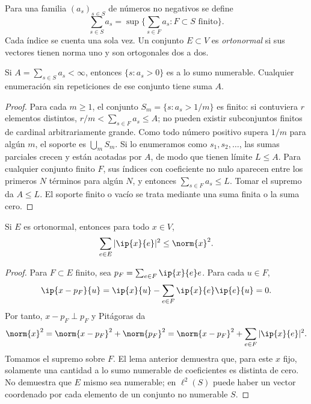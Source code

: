 \begin{definicion}\label{ch29:suma}
Para una familia $(a_s)_{s\in S}$ de números no negativos se define
\[
 \sum_{s\in S}a_s=\sup\Big\{\sum_{s\in F}a_s:F\subset S\text{ finito}\Big\}.
\]
Cada índice se cuenta una sola vez. Un conjunto $E\subset V$ es \emph{ortonormal} si sus vectores tienen norma uno y son ortogonales dos a dos.
\end{definicion}

\begin{lema}\label{ch29:soporte}
Si $A=\sum_{s\in S}a_s<\infty$, entonces $\{s:a_s>0\}$ es a lo sumo numerable. Cualquier enumeración sin repeticiones de ese conjunto tiene suma $A$.
\end{lema}
\begin{proof}
Para cada $m\geq1$, el conjunto $S_m=\{s:a_s>1/m\}$ es finito: si contuviera $r$ elementos distintos, $r/m<\sum_{s\in F}a_s\leq A$; no pueden existir subconjuntos finitos de cardinal arbitrariamente grande. Como todo número positivo supera $1/m$ para algún $m$, el soporte es $\bigcup_m S_m$. Si lo enumeramos como $s_1,s_2,\dots$, las sumas parciales crecen y están acotadas por $A$, de modo que tienen límite $L\leq A$. Para cualquier conjunto finito $F$, sus índices con coeficiente no nulo aparecen entre los primeros $N$ términos para algún $N$, y entonces $\sum_{s\in F}a_s\leq L$. Tomar el supremo da $A\leq L$. El soporte finito o vacío se trata mediante una suma finita o la suma cero.
\end{proof}

\begin{teorema}[Bessel]\label{ch29:bessel}
Si $E$ es ortonormal, entonces para todo $x\in V$,
\[
 \sum_{e\in E}|\ip{x}{e}|^{2}\leq\norm{x}^{2}.
\]
\end{teorema}
\begin{proof}
Para $F\subset E$ finito, sea $p_F=\sum_{e\in F}\ip{x}{e}e$. Para cada $u\in F$,
\[
 \ip{x-p_F}{u}=\ip{x}{u}-\sum_{e\in F}\ip{x}{e}\ip{e}{u}=0.
\]
Por tanto, $x-p_F\perp p_F$ y Pitágoras da
\[
 \norm{x}^{2}=\norm{x-p_F}^{2}+\norm{p_F}^{2}
 =\norm{x-p_F}^{2}+\sum_{e\in F}|\ip{x}{e}|^{2}.
\]
Tomamos el supremo sobre $F$. El lema anterior demuestra que, para este $x$ fijo, solamente una cantidad a lo sumo numerable de coeficientes es distinta de cero. No demuestra que $E$ mismo sea numerable; en $\ell^{2}(S)$ puede haber un vector coordenado por cada elemento de un conjunto no numerable $S$.
\end{proof}

